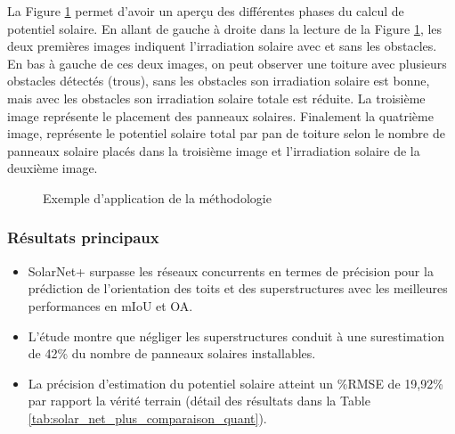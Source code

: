 \par{La Figure \ref{fig:solar_net_plus_exemple_methodo} permet d'avoir un aperçu des différentes phases du calcul de potentiel solaire. En allant de gauche à droite dans la lecture de la Figure \ref{fig:solar_net_plus_exemple_methodo}, les deux premières images indiquent l'irradiation solaire avec et sans les obstacles. En bas à gauche de ces deux images, on peut observer une toiture avec plusieurs obstacles détectés (trous), sans les obstacles son irradiation solaire est bonne, mais avec les obstacles son irradiation solaire totale est réduite. La troisième image représente le placement des panneaux solaires. Finalement la quatrième image, représente le potentiel solaire total par pan de toiture selon le nombre de panneaux solaire placés dans la troisième image et l'irradiation solaire de la deuxième image.}

\begin{figure}[H]
    \caption{Exemple d'application de la méthodologie \cite{li_deep_2024}}
    \label{fig:solar_net_plus_exemple_methodo}
\end{figure}

\subsubsection{Résultats principaux}
\begin{itemize}
    \item SolarNet+ surpasse les réseaux concurrents en termes de précision pour la prédiction de l'orientation des toits et des superstructures avec les meilleures performances en mIoU et OA.
    \item L'étude montre que négliger les superstructures conduit à une surestimation de 42\% du nombre de panneaux solaires installables.
    \item La précision d'estimation du potentiel solaire atteint un \%RMSE de 19,92\% par rapport la vérité terrain (détail des résultats dans la Table \ref{tab:solar_net_plus_comparaison_quant}).
\end{itemize}

